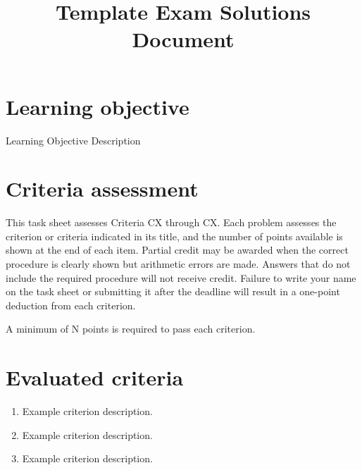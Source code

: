 \makeatletter
{}
\makeatother






\title{Template Exam Solutions Document}
\author{}
\date{}


	\maketitle
	\vspace{-2cm}
	\setcounter{tocdepth}{1}
	\setcounter{secnumdepth}{2}
	\label{toc}
	\tableofcontents
	
	\vspace{-5mm}
	\section*{Learning objective}\vspace{-5mm}
	Learning Objective Description
	
	\section*{Criteria assessment}\vspace{-5mm}
	This task sheet assesses Criteria CX through CX. Each problem assesses the criterion or criteria indicated in its title, and the number of points available is shown at the end of each item.
	Partial credit may be awarded when the correct procedure is clearly shown but arithmetic errors are made. Answers that do not include the required procedure will not receive credit.
	Failure to write your name on the task sheet or submitting it after the deadline will result in a one-point deduction from each criterion.
	
	A minimum of N points is required to pass each criterion.
	
	
	\section*{Evaluated criteria}
	\begin{enumerate}[label=\textbf{C\arabic*}]
		\item Example criterion description.
		\item Example criterion description.
		\item Example criterion description.
	\end{enumerate}
	
